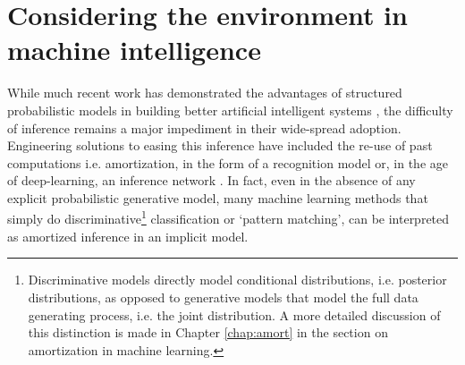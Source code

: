 
\section*{Considering the environment in machine intelligence}

While much recent work has demonstrated the advantages of structured probabilistic models in building better artificial intelligent systems \citep{lake2015human, del2013understanding, zhao2011image, steyvers2007probabilistic}, the difficulty of inference remains a major impediment in their wide-spread adoption. Engineering solutions to easing this inference have included the re-use of past computations i.e. amortization, in the form of a recognition model\citep{dayan1995helmholtz, kingma2014auto} or, in the age of deep-learning, an inference network \citep{kulkarni2015picture, mnih2014neural, rezende2015variational, paige2016inference}. In fact, even in the absence of any explicit probabilistic generative model, many machine learning methods that simply do discriminative\footnote{Discriminative models directly model conditional distributions, i.e. posterior distributions, as opposed to generative models that model the full data generating process, i.e. the joint distribution. A more detailed discussion of this distinction is made in Chapter \ref{chap:amort} in the section on amortization in machine learning.} classification or `pattern matching', can be interpreted as amortized inference in an implicit model.%

